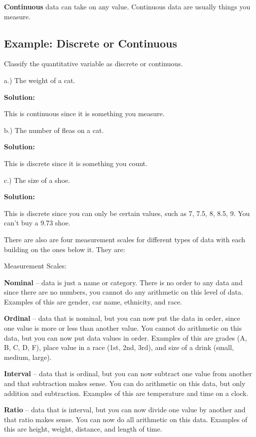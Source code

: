 \documentclass[
]{book}
\begin{document}
\textbf{Continuous} data can take on any value. Continuous data are usually things you measure.

\hypertarget{example-discrete-or-continuous}{%
\subsection{Example: Discrete or Continuous}\label{example-discrete-or-continuous}}

Classify the quantitative variable as discrete or continuous.

a.) The weight of a cat.

\textbf{Solution:}

This is continuous since it is something you measure.

b.) The number of fleas on a cat.

\textbf{Solution:}

This is discrete since it is something you count.

c.) The size of a shoe.

\textbf{Solution:}

This is discrete since you can only be certain values, such as 7, 7.5, 8, 8.5, 9. You can't buy a 9.73 shoe.

There are also are four measurement scales for different types of data with each building on the ones below it. They are:

Measurement Scales:

\textbf{Nominal} -- data is just a name or category. There is no order to any data and since there are no numbers, you cannot do any arithmetic on this level of data. Examples of this are gender, car name, ethnicity, and race.

\textbf{Ordinal} -- data that is nominal, but you can now put the data in order, since one value is more or less than another value. You cannot do arithmetic on this data, but you can now put data values in order. Examples of this are grades (A, B, C, D, F), place value in a race (1st, 2nd, 3rd), and size of a drink (small, medium, large).

\textbf{Interval} -- data that is ordinal, but you can now subtract one value from another and that subtraction makes sense. You can do arithmetic on this data, but only addition and subtraction. Examples of this are temperature and time on a clock.

\textbf{Ratio} -- data that is interval, but you can now divide one value by another and that ratio makes sense. You can now do all arithmetic on this data. Examples of this are height, weight, distance, and length of time.
\end{document}
